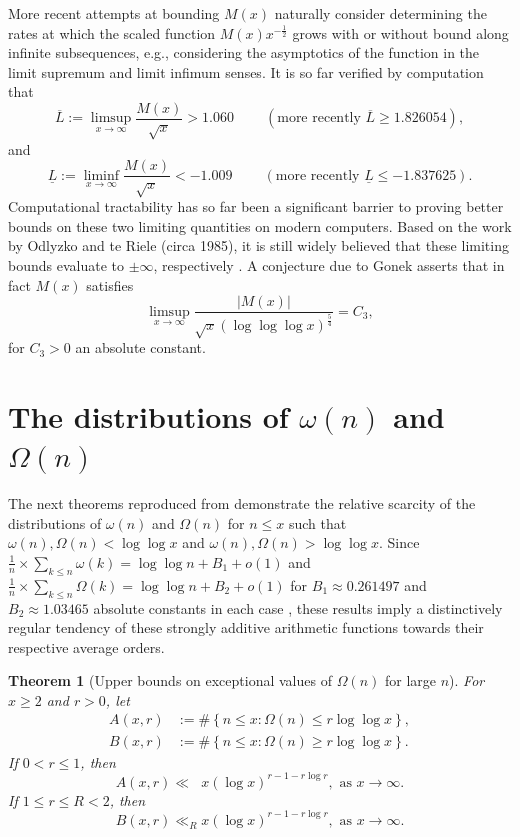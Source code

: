 \documentclass[11pt,reqno,a4letter]{article}
\numberwithin{equation}{section}
\numberwithin{figure}{section}
\numberwithin{table}{section}
\newcommand{\cf}{\textit{cf.\ }}
\newcommand{\seqnum}[1]{\href{http://oeis.org/#1}{\color{ProcessBlue}{\underline{#1}}}}
\theoremstyle{plain}
\newtheorem{theorem}{Theorem}
\numberwithin{theorem}{section}
\theoremstyle{definition}
\begin{document}
More recent attempts 
at bounding $M(x)$ naturally consider determining the rates at which the scaled function 
$M(x) x^{-\frac{1}{2}}$ grows with or without bound along infinite 
subsequences, e.g., considering the asymptotics of the function 
in the limit supremum and limit infimum senses. 
It is so far verified by computation 
that \cite[\cf \S 4.1]{PRIMEREC} 
\cite[\cf \seqnum{A051400}; \seqnum{A051401}]{OEIS} 
\[
\overline{L} := \limsup_{x\rightarrow\infty} \frac{M(x)}{\sqrt{x}} > 1.060\ 
     \qquad (\text{more recently } \overline{L} \geq 1.826054), 
\] 
and 
\[ 
\underline{L} := \liminf_{x\rightarrow\infty} \frac{M(x)}{\sqrt{x}} < -1.009\ 
     \qquad (\text{more recently } \underline{L} \leq -1.837625). 
\] 
Computational tractability has so far been a significant barrier to 
proving better bounds on these two limiting quantities on modern computers. 
Based on the work by Odlyzko and te Riele (circa 1985), it is still widely believed that 
these limiting bounds evaluate to $\pm \infty$, respectively 
\cite{ODLYZ-TRIELE,MREVISITED,ORDER-MERTENSFN,HURST-2017}. 
A conjecture due to Gonek asserts that 
in fact $M(x)$ satisfies \cite{NG-MERTENS}
$$\limsup_{x \rightarrow \infty} \frac{|M(x)|}{\sqrt{x} (\log\log\log x)^{\frac{5}{4}}} = C_3,$$ 
for $C_3 > 0$ an absolute constant. 

\section{The distributions of $\omega(n)$ and $\Omega(n)$} 
\label{subSection_TheKnownDistsOfThePrimeOmegaFunctions_IntroResults_v1} 

The next theorems reproduced from \cite[\S 7.4]{MV} demonstrate the relative 
scarcity of the distributions of $\omega(n)$ and $\Omega(n)$ for $n \leq x$ such that 
$\omega(n),\Omega(n) < \log\log x$ and $\omega(n),\Omega(n) > \log\log x$. 
Since $\frac{1}{n} \times \sum_{k \leq n} \omega(k) = \log\log n + B_1 + o(1)$ and 
$\frac{1}{n} \times \sum_{k \leq n} \Omega(k) = \log\log n + B_2 + o(1)$ for 
$B_1 \approx 0.261497$ and $B_2 \approx 1.03465$ 
absolute constants in each case \cite[\S 22.10]{HARDYWRIGHT}, 
these results imply a distinctively regular tendency 
of these strongly additive arithmetic functions towards their respective average orders. 

\begin{theorem}[Upper bounds on exceptional values of $\Omega(n)$ for large $n$] 
\label{theorem_MV_Thm7.20-init_stmt} 
For $x \geq 2$ and $r > 0$, let 
\begin{align*} 
A(x, r) & := \#\left\{n \leq x: \Omega(n) \leq r \log\log x\right\}, \\ 
B(x, r) & := \#\left\{n \leq x: \Omega(n) \geq r \log\log x\right\}. 
\end{align*} 
If $0 < r \leq 1$, then 
\[
A(x, r) \ll\phantom{_R} x (\log x)^{r-1 - r\log r}, \text{ as } x \rightarrow \infty. 
\]
If $1 \leq r \leq R < 2$, then 
\[
B(x, r) \ll_R x (\log x)^{r-1-r \log r}, \text{ as } x \rightarrow \infty. 
\]
\end{theorem} 
\end{document}
